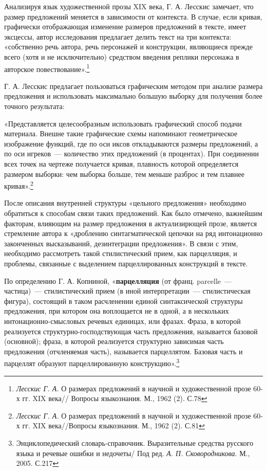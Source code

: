 \documentclass{kursa4}
\begin{document}
      Анализируя язык художественной прозы XIX века, Г. А. Лесскис
      замечает, что размер предложений меняется в зависимости от контекста.
      В случае, если кривая, графически отображающая изменение размеров
      предложений в тексте, имеет эксцессы, автор исследования предлагает
      делить текст на три контекста: «собственно речь автора, речь
      персонажей и конструкции, являющиеся прежде всего (хотя и не
      исключительно) средством введения реплики персонажа в авторское
      повествование».\footnote{\textit{{ Лесскис Г. А.
      }}{О размерах предложений в научной и художественной
      прозе 60-х гг. XIX века// Вопросы языкознания. М., 1962 (2). С.78}}

      Г. А. Лесскис предлагает пользоваться графическим методом при
      анализе размера предложения и использовать максимально большую выборку
      для получения более точного результата:

      «Представляется целесообразным использовать
      графический способ подачи материала. Внешне такие графические схемы
      напоминают геометрическое изображение функций, где по оси иксов
      откладываются размеры предложений, а по оси игреков~--- количество этих
      предложений (в процентах). При соединении всех точек на чертеже
      получается кривая, плавность которой определяется размером выборки: чем
      выборка больше, тем меньше разброс и тем плавнее
      кривая».\footnote{\textit{{ Лесскис Г. А.
      }}{О размерах предложений в научной и художественной
      прозе 60-х гг. XIX века//Вопросы языкознания. М., 1962 (2). С.81}}

      После описания внутренней структуры «цельного предложения» необходимо обратиться к способам связи таких предложений. Как было отмечено, важнейшим факторам, влияющим на размер предложения в актуализирющей прозе, является стремление автора к «дроблению синтагматической цепочки на ряд интонационно законченных высказываний, дезинтеграции предложения». В связи с этим, необходимо рассмотреть такой стилистический прием, как парцелляция, и проблемы, связанные с выделением парцеллированных конструкций в тексте. 

      По определению Г. А.
      Копниной, «\textbf{парцелляция} (от франц. parcelle~--- частица)~--- стилистический прием (в иной
      интерпретации~--- стилистическая фигура), состоящий в таком расчленении
      единой синтаксической структуры предложения, при котором она
      воплощается не в одной, а в нескольких интонационно-смысловых речевых
      единицах, или фразах. Фраза, в которой реализуется
      структурно-господствующая часть предложения, называется базовой
      (основной); фраза, в которой реализуется структурно зависимая часть
      предложения (отчленяемая часть), называется парцеллятом. Базовая часть
      и парцеллят образуют парцеллированную
      конструкцию».\footnote{{ Энциклопедический
      словарь-справочник. Выразительные средства русского языка и речевые
      ошибки и недочеты/ Под ред. }\textit{{А. П.
      Сковородникова}}{. М., 2005. С.217}}
\end{document}
